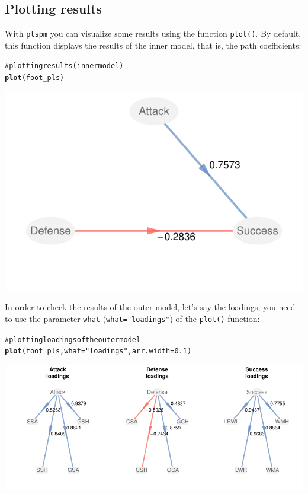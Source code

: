 \documentclass[12pt]{book}\usepackage{graphicx, color}
\makeatletter
\newcommand{\hlfunctioncall}[1]{\textcolor[rgb]{0.501960784313725,0,0.329411764705882}{\textbf{#1}}}%
\newcommand{\hlstring}[1]{\textcolor[rgb]{0.6,0.6,1}{#1}}%
\newcommand{\hlcomment}[1]{\textcolor[rgb]{0.180392156862745,0.6,0.341176470588235}{#1}}%
\newenvironment{kframe}{%
 \def\at@end@of@kframe{}%
 \ifinner\ifhmode%
  \def\at@end@of@kframe{\end{minipage}}%
  \begin{minipage}{\columnwidth}%
 \fi\fi%
 \def\FrameCommand##1{\hskip\@totalleftmargin \hskip-\fboxsep
 \colorbox{shadecolor}{##1}\hskip-\fboxsep
     \hskip-\linewidth \hskip-\@totalleftmargin \hskip\columnwidth}%
 \MakeFramed {\advance\hsize-\width
   \@totalleftmargin\z@ \linewidth\hsize
   \@setminipage}}%
 {\par\unskip\endMakeFramed%
 \at@end@of@kframe}
\newenvironment{knitrout}{}{} %
\newcommand{\plspm}{\texttt{plspm}}
\newcommand{\code}[1]{\texttt{#1}}
\makeatother
\begin{document}
\subsection{Plotting results}
With \plspm{} you can visualize some results using the function \code{plot()}. By default, this function displays the results of the inner model, that is, the path coefficients:
\begin{knitrout}
\color{fgcolor}\begin{kframe}
\begin{alltt}
\hlcomment{# plotting results (inner model)}
\hlfunctioncall{plot}(foot_pls)
\end{alltt}
\end{kframe}

{\centering \includegraphics[width=.7\linewidth,height=.4\linewidth]{figure/plot_inner_foot_pls} 

}



\end{knitrout}


In order to check the results of the outer model, let's say the loadings, you need to use the parameter \code{what} (\code{what="loadings"}) of the \code{plot()} function:
\begin{knitrout}
\color{fgcolor}\begin{kframe}
\begin{alltt}
\hlcomment{# plotting loadings of the outer model}
\hlfunctioncall{plot}(foot_pls, what = \hlstring{"loadings"}, arr.width = 0.1)
\end{alltt}
\end{kframe}

{\centering \includegraphics[width=1\linewidth,height=.45\linewidth]{figure/plot_loadings_foot_pls} 

}



\end{knitrout}
\end{document}
